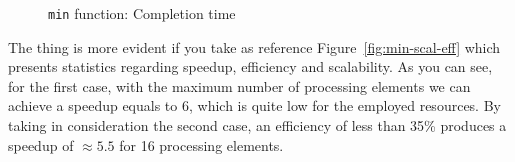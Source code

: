 \begin{figure}[!h]
  \caption{\texttt{min} function: Completion time}
  \label{fig:min-tc}
\end{figure}

The thing is more evident if you take as reference
Figure~\ref{fig:min-scal-eff} which presents statistics regarding
speedup, efficiency and scalability. As you can see, for the first case, with the
maximum number of processing elements we can achieve a speedup
equals to 6, which is quite low for the employed resources. By taking in
consideration the second case, an efficiency of less than 35\% produces
a speedup of $\approx 5.5$ for 16 processing elements.

